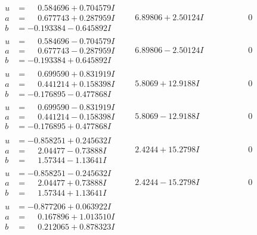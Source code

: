 \documentclass[1p]{elsarticle_modified}
\theoremstyle{definition}
\begin{document}
$$\begin{array}{c|c|c}
\begin{aligned}
u &= \phantom{-}0.584696 + 0.704579 I \\
a &= \phantom{-}0.677743 + 0.287959 I \\
b &= -0.193384 - 0.645892 I\end{aligned}
 & \phantom{-}6.89806 + 2.50124 I & \phantom{-0.000000 } 0 \\ \hline\begin{aligned}
u &= \phantom{-}0.584696 - 0.704579 I \\
a &= \phantom{-}0.677743 - 0.287959 I \\
b &= -0.193384 + 0.645892 I\end{aligned}
 & \phantom{-}6.89806 - 2.50124 I & \phantom{-0.000000 } 0 \\ \hline\begin{aligned}
u &= \phantom{-}0.699590 + 0.831919 I \\
a &= \phantom{-}0.441214 + 0.158398 I \\
b &= -0.176895 - 0.477868 I\end{aligned}
 & \phantom{-}5.8069 + 12.9188 I & \phantom{-0.000000 } 0 \\ \hline\begin{aligned}
u &= \phantom{-}0.699590 - 0.831919 I \\
a &= \phantom{-}0.441214 - 0.158398 I \\
b &= -0.176895 + 0.477868 I\end{aligned}
 & \phantom{-}5.8069 - 12.9188 I & \phantom{-0.000000 } 0 \\ \hline\begin{aligned}
u &= -0.858251 + 0.245632 I \\
a &= \phantom{-}2.04477 - 0.73888 I \\
b &= \phantom{-}1.57344 - 1.13641 I\end{aligned}
 & \phantom{-}2.4244 + 15.2798 I & \phantom{-0.000000 } 0 \\ \hline\begin{aligned}
u &= -0.858251 - 0.245632 I \\
a &= \phantom{-}2.04477 + 0.73888 I \\
b &= \phantom{-}1.57344 + 1.13641 I\end{aligned}
 & \phantom{-}2.4244 - 15.2798 I & \phantom{-0.000000 } 0 \\ \hline\begin{aligned}
u &= -0.877206 + 0.063922 I \\
a &= \phantom{-}0.167896 + 1.013510 I \\
b &= \phantom{-}0.212065 + 0.878323 I\end{aligned}

\end{array}$$
\end{document}
